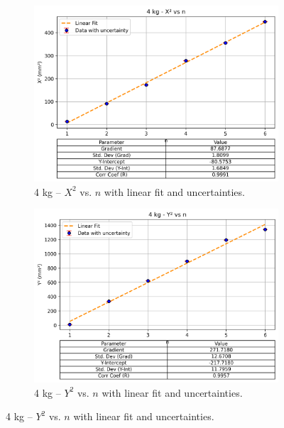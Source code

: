 \documentclass[a4paper,11pt]{article}
\begin{document}
\begin{figure}[H]
  \centering
  \begin{subfigure}[b]{0.45\textwidth}
    \centering
    \includegraphics[width=\textwidth]{4kg_X2_vs_n_with_errorbar.png}
    \caption{4 kg -- \(X^2\) vs. \(n\) with linear fit and uncertainties.}
    \label{fig:4kgX2vsn}
  \end{subfigure}
  \hfill
  \begin{subfigure}[b]{0.45\textwidth}
    \centering
    \includegraphics[width=\textwidth]{4kg_Y2_vs_n_with_errorbar.png}
    \caption{4 kg -- \(Y^2\) vs. \(n\) with linear fit and uncertainties.}
    \label{fig:4kgY2vsn}
  \end{subfigure}
  
  \vspace{1em} %
  

\end{figure}
\end{document}

